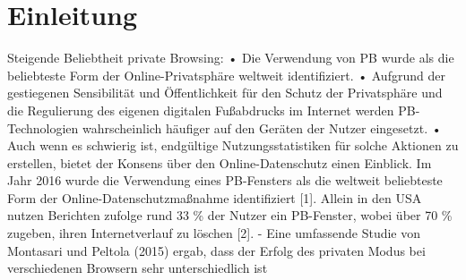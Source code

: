 \chapter{Einleitung}

Steigende Beliebtheit private Browsing: \cite{Horsman.2019}
	•	Die Verwendung von PB wurde als die beliebteste Form der Online-Privatsphäre weltweit identifiziert.
	•	Aufgrund der gestiegenen Sensibilität und Öffentlichkeit für den Schutz der Privatsphäre und die Regulierung des eigenen digitalen Fußabdrucks im Internet werden PB-Technologien wahrscheinlich häufiger auf den Geräten der Nutzer eingesetzt. 
	•	Auch wenn es schwierig ist, endgültige Nutzungsstatistiken für solche Aktionen zu erstellen, bietet der Konsens über den Online-Datenschutz einen Einblick. Im Jahr 2016 wurde die Verwendung eines PB-Fensters als die weltweit beliebteste Form der Online-Datenschutzmaßnahme identifiziert [1]. Allein in den USA nutzen Berichten zufolge rund 33 \% der Nutzer ein PB-Fenster, wobei über 70 \% zugeben, ihren Internetverlauf zu löschen [2].
	- Eine umfassende Studie von Montasari und Peltola (2015) ergab, dass der Erfolg des privaten Modus bei verschiedenen Browsern sehr unterschiedlich ist 


